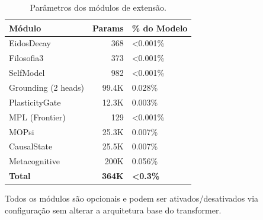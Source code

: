 \begin{table}[H]
\centering
\caption{Par\^ametros dos m\'odulos de extens\~ao.}
\label{tab:overhead}
\begin{tabular}{lrl}
\toprule
\textbf{M\'odulo} & \textbf{Params} & \textbf{\% do Modelo} \\
\midrule
EidosDecay & 368 & <0.001\% \\
Filosofia3 & 373 & <0.001\% \\
SelfModel & 982 & <0.001\% \\
Grounding (2 heads) & 99.4K & 0.028\% \\
PlasticityGate & 12.3K & 0.003\% \\
MPL (Frontier) & 129 & <0.001\% \\
MOPsi & 25.3K & 0.007\% \\
CausalState & 25.5K & 0.007\% \\
Metacognitive & 200K & 0.056\% \\
\midrule
\textbf{Total} & \textbf{~364K} & \textbf{<0.3\%} \\
\bottomrule
\end{tabular}
\end{table}

Todos os m\'odulos s\~ao opcionais e podem ser ativados/desativados via
configura\c{c}\~ao sem alterar a arquitetura base do transformer.
